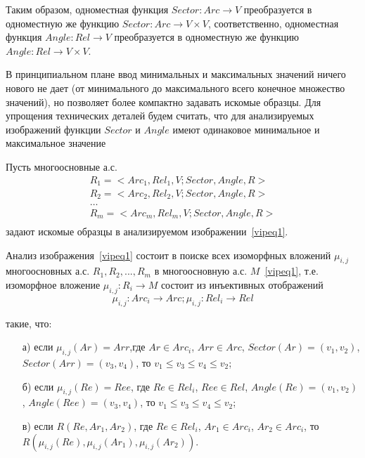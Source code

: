 Таким образом, одноместная функция $Sector: Arc \rightarrow V$ преобразуется в одноместную же функцию $Sector: Arc \rightarrow V \times V$, соответственно, одноместная функция $Angle: Rel \rightarrow V$ преобразуется в одноместную же функцию $Angle: Rel \rightarrow V \times V$.

\begin{remark}
В принципиальном плане ввод минимальных и максимальных значений ничего нового не дает (от минимального до максимального всего конечное множество значений), но позволяет более компактно задавать искомые образцы. Для упрощения технических деталей будем считать, что для анализируемых изображений функции $Sector$ и $Angle$ имеют одинаковое минимальное и максимальное значение
\end{remark}

Пусть многоосновные а.с.
\begin{equation}
	\begin{array}{c}
	R_1=<Arc_1, Rel_1, V; Sector, Angle, R> \\
	R_2=<Arc_2, Rel_2, V; Sector, Angle, R> \\
	\dots\\
	R_m=<Arc_m, Rel_m, V; Sector, Angle, R> \\
	\end{array}
	\label{vipeq3}
\end{equation}
задают искомые образцы в анализируемом изображении~\ref{vipeq1}.

Анализ изображения~\ref{vipeq1} состоит в поиске всех изоморфных вложений ${ \mu_{i,j} }$ многоосновных а.с. $R_1,R_2,...,R_m$ в многоосновную а.с. $M$~\ref{vipeq1}, т.е. изоморфное вложение $\mu_{i,j} : R_i \rightarrow M$ состоит из инъективных отображений
\begin{equation}
\mu_{i,j} : Arc_i \rightarrow Arc; \mu_{i,j} : Rel_i \rightarrow Rel
\label{vipeq4}
\end{equation}

такие, что:

\begin{enumerate}
\item[а)] если $\mu_{i,j}(Ar) = Arr$,где $Ar \in Arc_i$, $Arr \in Arc$, $Sector(Ar) = (v_1, v_2)$, $Sector(Arr) = (v_3, v_4)$, то $v_1 \le v_3 \le v_4 \le v_2$;
\item[б)] если $\mu_{i,j}(Re) = Ree$, где $Re \in Rel_i$, $Ree \in Rel$, $Angle(Re) = (v_1, v_2)$, $Angle(Ree) = (v_3, v_4)$, то $v_1 \le v_3 \le v_4 \le v_2$;
\item[в)] если $R(Re, Ar_1, Ar_2)$, где $Re \in Rel_i$, $Ar_1 \in Arc_i$, $Ar_2 \in Arc_i$, то $R(\mu_{i,j}(Re), \mu_{i,j}(Ar_1), \mu_{i,j}(Ar_2))$.
\end{enumerate}

